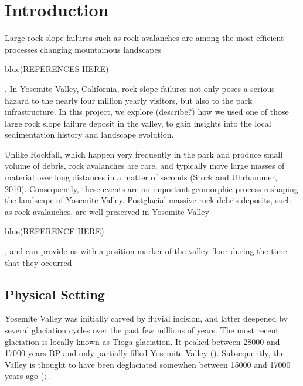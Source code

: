 \documentclass[utf8]{frontiersSCNS}
\newcommand{\COMON}{\begin{color}{blue}}
\newcommand{\COMOFF}{\end{color}}
\begin{document}








\section{Introduction}

Large rock slope failures such as rock avalanches are among the most efficient processes changing mountainous landscapes \COMON (REFERENCES HERE) \COMOFF. In Yosemite Valley, California, rock slope failures not only poses a serious hazard to the nearly four million yearly visitors, but also to the park infrastructure. In this project, we explore (describe?) how we used one of those large rock slope failure deposit in the valley, to gain insights into the local sedimentation history and landscape evolution. 

Unlike Rockfall, which happen very frequently in the park and produce small volume of debris, rock avalanches are rare, and typically move large masses of material over long distances in a matter of seconds (Stock and Uhrhammer, 2010). Consequently, these events are an important geomorphic process reshaping the landscape of Yosemite Valley. Postglacial massive rock debris deposits, such as rock avalanches,  are well preserved in Yosemite Valley \COMON (REFERENCE HERE) \COMOFF, and can provide us with a position marker of the valley floor during the time that they occurred


\subsection{Physical Setting}

Yosemite Valley was initially carved by fluvial incision, and latter deepened by several glaciation cycles over the past few millions of years. The most recent glaciation is locally known as Tioga glaciation. It peaked between \num{28000} and \num{17000} years BP and only partially filled  Yosemite Valley (\cite{huber1987geologic}). Subsequently, the Valley is thought to have been deglaciated somewhen between \num{15000} and \num{17000} years ago (\cite{huber1987geologic};  \cite{Wieczorek+1996}.
\end{document}
